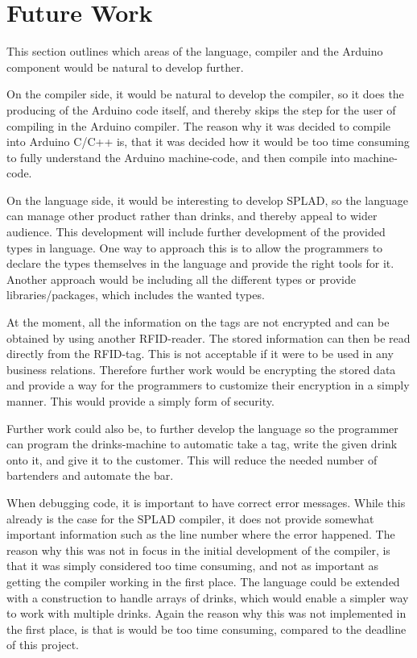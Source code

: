 \section{Future Work} %
This section outlines which areas of the language, compiler and the Arduino component would be natural to develop further.

On the compiler side, it would be natural to develop the compiler, so it does the producing of the Arduino code itself, and thereby skips the step for the user of compiling in the Arduino compiler. The reason why it was decided to compile into Arduino C/C++ is, that it was decided how it would be too time consuming to fully understand the Arduino machine-code, and then compile into machine-code.

On the language side, it would be interesting to develop SPLAD, so the language can manage other product rather than drinks, and thereby appeal to wider audience. This development will include further development of the provided types in language. One way to approach this is to allow the programmers to declare the types themselves in the language and provide the right tools for it. Another approach would be including all the different types or provide libraries/packages, which includes the wanted types.

At the moment, all the information on the tags are not encrypted and can be obtained by using another RFID-reader. The stored information can then be read directly from the RFID-tag. This is not acceptable if it were to be used in any business relations. Therefore further work would be encrypting the stored data and provide a way for the programmers to customize their encryption in a simply manner. This would provide a simply form of security.

Further work could also be, to further develop the language so the programmer can program the drinks-machine to automatic take a tag, write the given drink onto it, and give it to the customer. This will reduce the needed number of bartenders and automate the bar.

When debugging code, it is important to have correct error messages. While this already is the case for the SPLAD compiler, it does not provide somewhat important information such as the line number where the error happened. The reason why this was not in focus in the initial development of the compiler, is that it was simply considered too time consuming, and not as important as getting the compiler working in the first place. The language could be extended with a construction to handle arrays of drinks, which would enable a simpler way to work with multiple drinks. Again the reason why this was not implemented in the first place, is that is would be too time consuming, compared to the deadline of this project.


